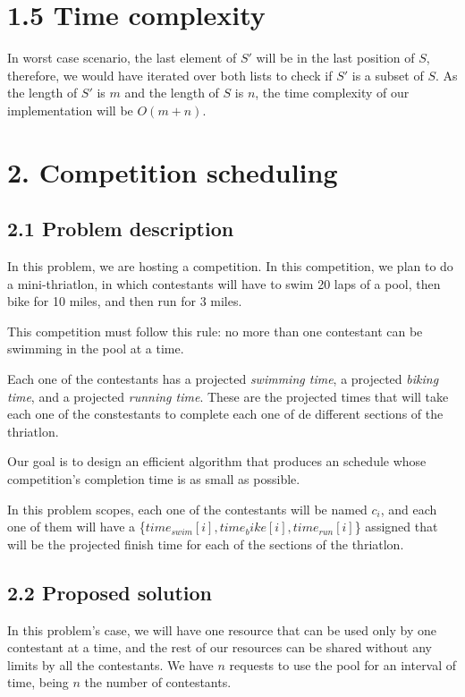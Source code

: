 \documentclass{article}
\begin{document}


\section*{1.5 Time complexity}

In worst case scenario, the last element of $S'$ will be in the last position of $S$, therefore, we would have iterated over both lists to check if $S'$ is a subset of $S$. As the length of $S'$ is $m$ and the length of $S$ is $n$, the time complexity of our implementation will be $O(m+n)$.

\pagebreak

\section*{2. Competition scheduling}

\subsection*{2.1 Problem description}

In this problem, we are hosting a competition. In this competition, we plan to do a mini-thriatlon, in which contestants will have to swim 20 laps of a pool, then bike for 10 miles, and then run for 3 miles. 

This competition must follow this rule: no more than one contestant can be swimming in the pool at a time.

Each one of the contestants has a projected \textit{swimming time}, a projected \textit{biking time}, and a projected \textit{running time}. These are the projected times that will take each one of the constestants to complete each one of de different sections of the thriatlon.

Our goal is to design an efficient algorithm that produces an schedule whose competition's completion time is as small as possible.

In this problem scopes, each one of the contestants will be named $c_i$, and each one of them will have a \{$time_{swim}[i],time_bike[i],time_{run}[i]$\} assigned that will be the projected finish time for each of the sections of the thriatlon.

\subsection*{2.2 Proposed solution}

In this problem's case, we will have one resource that can be used only by one contestant at a time, and the rest of our resources can be shared without any limits by all the contestants. We have $n$ requests to use the pool for an interval of time, being $n$ the number of contestants.
\end{document}
